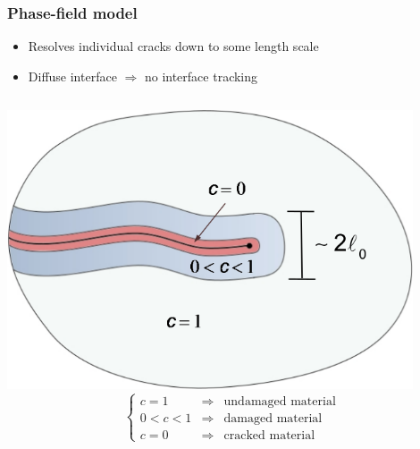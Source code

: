 \documentclass{beamer}
\begin{document}
\begin{frame}
  \frametitle{Phase-field model}

  \begin{itemize}
  \item Resolves individual cracks down to some length scale
  \item Diffuse interface $\Rightarrow$ no interface tracking
  \end{itemize}

  \begin{columns}[c]
    \includegraphics[width=0.9\textwidth]{figs/phasefield}
    \[
      \left\{
        \begin{array}{lcl}
          c = 1     &\Rightarrow& \mbox{undamaged material} \\
          0 < c < 1 &\Rightarrow& \mbox{damaged material} \\
          c = 0     &\Rightarrow& \mbox{cracked material}
        \end{array}
      \right.
    \]
  \end{columns}
\end{frame}
\end{document}
